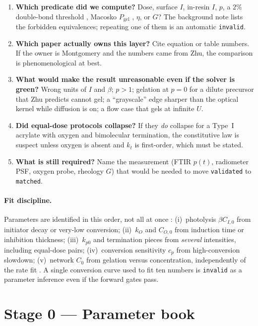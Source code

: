 \documentclass[11pt,a4paper]{article}
\newcommand{\tagvalid}{\texttt{validated}}
\newcommand{\tagmatch}{\texttt{matched}}
\newcommand{\taginvalid}{\texttt{invalid}}
\begin{document}
\begin{enumerate}
  \item \textbf{Which predicate did we compute?}
    Dose, surface $I$, in-resin $I$, $p$, a $2\%$ double-bond threshold \citep{Slutzky2019}, Macosko $P_{\mathrm{gel}}$ \citep{Zhu2020}, $\eta$, or $G$?
    The background note lists the forbidden equivalences; repeating one of them is an automatic \taginvalid.
  \item \textbf{Which paper actually owns this layer?}
    Cite equation or table numbers.
    If the owner is Montgomery and the numbers came from Zhu, the comparison is phenomenological at best.
  \item \textbf{What would make the result unreasonable even if the solver is green?}
    Wrong units of $I$ and $\beta$; $p>1$; gelation at $p=0$ for a dilute precursor that Zhu predicts cannot gel; a ``grayscale'' edge sharper than the optical kernel while diffusion is on; a flow case that gels at infinite $U$.
  \item \textbf{Did equal-dose protocols collapse?}
    If they \emph{do} collapse for a Type~I acrylate with oxygen and bimolecular termination, the constitutive law is suspect \citep{Wydra2014} unless oxygen is absent and $k_t$ is first-order, which must be stated.
  \item \textbf{What is still required?}
    Name the measurement (FTIR $p(t)$, radiometer PSF, oxygen probe, rheology $G$) that would be needed to move \tagvalid{} to \tagmatch.
\end{enumerate}

\paragraph{Fit discipline.}
Parameters are identified in this order, not all at once \citep{Montgomery2022,Dobson2024}:
(i)~photolysis $\beta C_{I,0}$ from initiator decay or very-low conversion;
(ii)~$k_O$ and $C_{O,0}$ from induction time or inhibition thickness;
(iii)~$k_{p0}$ and termination pieces from \emph{several} intensities, including equal-dose pairs;
(iv)~conversion sensitivity $c_p$ from high-conversion slowdown;
(v)~network $C_0$ from gelation versus concentration, independently of the rate fit \citep{Zhu2020}.
A single conversion curve used to fit ten numbers is \taginvalid{} as a parameter inference even if the forward gates pass.

\section{Stage 0 --- Parameter book}
\end{document}
